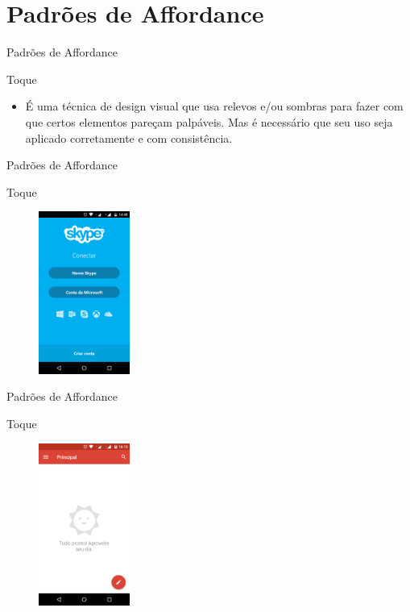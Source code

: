 \section{Padrões de Affordance}

\begin{frame}{Padrões de Affordance}
\begin{block}{Toque}
  \begin{itemize}
    \item<1-> É uma técnica de design visual que usa relevos e/ou sombras para fazer com que certos elementos pareçam palpáveis. Mas é necessário que seu uso seja aplicado corretamente e com consistência.
  \end{itemize}
\end{block}
\end{frame}

\begin{frame}{Padrões de Affordance}
\begin{block}{Toque}
    \begin{figure}
    \includegraphics[width=3cm]{figuras/touch/tocar}
    \end{figure}
\end{block}
\end{frame}

\begin{frame}{Padrões de Affordance}
\begin{block}{Toque}
    \begin{figure}
    \includegraphics[width=3cm]{figuras/touch/tocar2}
    \end{figure}
\end{block}
\end{frame}

